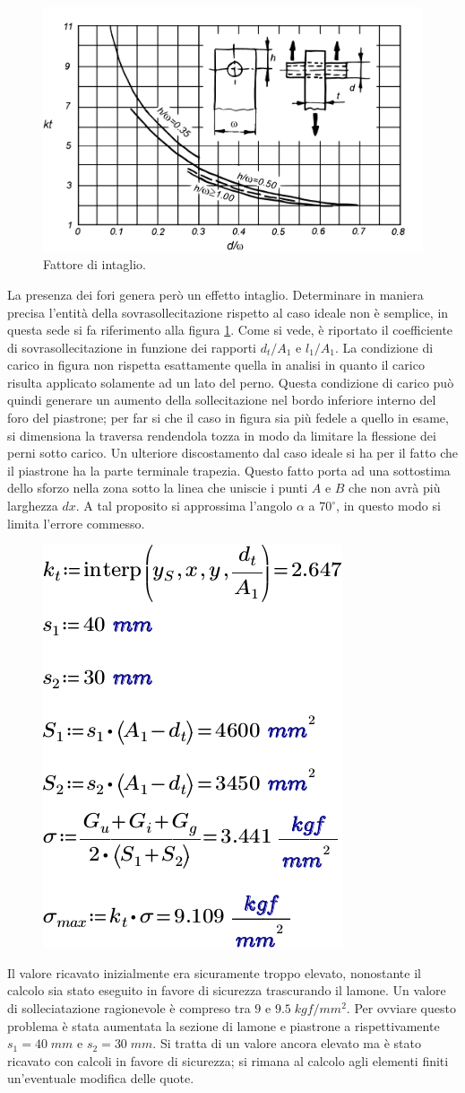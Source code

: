 \begin{figure}[H]
\centering
  \includegraphics[width=.6\textwidth]{imgs/Cap6/4 FattoreForma}
\caption{Fattore di intaglio.}
\label{fig:FattoreForma}
\end{figure}
La presenza dei fori genera però un effetto intaglio. 
Determinare in maniera precisa l'entità della sovrasollecitazione rispetto al caso ideale non è semplice, in questa sede si fa riferimento alla figura \ref{fig:FattoreForma}. 
Come si vede, è riportato il coefficiente di sovrasollecitazione in funzione dei rapporti $d_t/A_1$ e $l_1/A_1$. 
La condizione di carico in figura non rispetta esattamente quella in analisi in quanto il carico risulta applicato solamente ad un lato del perno. 
Questa condizione di carico può quindi generare un aumento della sollecitazione nel bordo inferiore interno del foro del piastrone; per far si che il caso in figura sia più fedele a quello in esame, si dimensiona la traversa rendendola tozza in modo da limitare la flessione dei perni sotto carico. 
Un ulteriore discostamento dal caso ideale si ha per il fatto che il piastrone ha la parte terminale trapezia.
Questo fatto porta ad una sottostima dello sforzo nella zona sotto la linea che uniscie i punti $A$ e $B$ che non avrà più larghezza $dx$. 
A tal proposito si approssima l'angolo $\alpha$ a $70^\circ$, in questo modo si limita l'errore commesso. 
\begin{figure}[H]
\centering
  \includegraphics[width=.3\textwidth]{imgs/MathLP2}
\caption{}
\label{fig:MathLP2}
\end{figure}
Il valore ricavato inizialmente era sicuramente troppo elevato, nonostante il calcolo sia stato eseguito in favore di sicurezza trascurando il lamone. 
Un valore di solleciatazione ragionevole è compreso tra $9$ e $9.5 \; kgf/mm^2$. Per ovviare questo problema è stata aumentata la sezione di lamone e piastrone a rispettivamente $s_1=40 \; mm$ e $s_2=30 \; mm$. 
Si tratta di un valore ancora elevato ma è stato ricavato con calcoli in favore di sicurezza; si rimana al calcolo agli elementi finiti un'eventuale modifica delle quote. 


